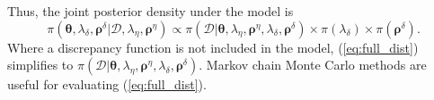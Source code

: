 \documentclass[12pt]{article}
\begin{document}
Thus, the joint posterior density under the model is
%
\begin{equation} \label{eq:full_dist}
\pi(\boldsymbol \theta,\lambda_\delta,\boldsymbol \rho^\delta|\mathcal D,\lambda_\eta,\boldsymbol \rho^\eta)
\propto \pi(\mathcal D | \boldsymbol \theta,\lambda_\eta, \boldsymbol \rho^\eta,\lambda_\delta,\boldsymbol \rho^\delta) \times %
\pi(\lambda_\delta) \times \pi(\boldsymbol \rho^\delta).
\end{equation}
%
Where a discrepancy function is not included in the model, 
(\ref{eq:full_dist}) simplifies to 
%
$\pi(\mathcal D | \boldsymbol \theta,\lambda_\eta, \boldsymbol \rho^\eta,\lambda_\delta,\boldsymbol \rho^\delta)$. 
%
Markov chain Monte Carlo methods are useful for evaluating (\ref{eq:full_dist}).

%
\end{document}
